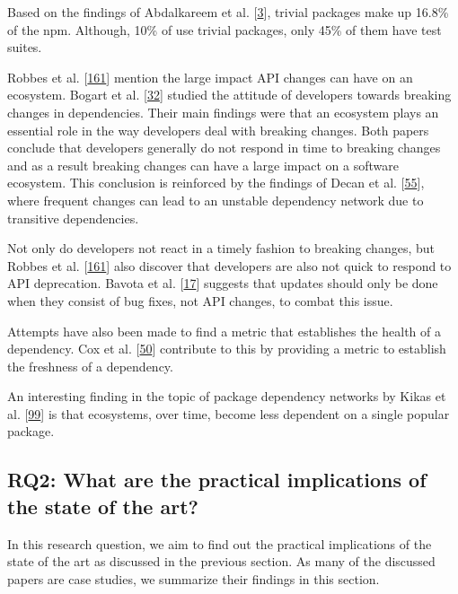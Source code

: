\documentclass[]{book}
\begin{document}
Based on the findings of Abdalkareem et al.
{[}\protect\hyperlink{ref-Abdalkareem2017}{3}{]}, trivial packages make
up 16.8\% of the npm. Although, 10\% of use trivial packages, only 45\%
of them have test suites.

Robbes et al. {[}\protect\hyperlink{ref-Robbes2012}{161}{]} mention the
large impact API changes can have on an ecosystem. Bogart et al.
{[}\protect\hyperlink{ref-Bogart2016}{32}{]} studied the attitude of
developers towards breaking changes in dependencies. Their main findings
were that an ecosystem plays an essential role in the way developers
deal with breaking changes. Both papers conclude that developers
generally do not respond in time to breaking changes and as a result
breaking changes can have a large impact on a software ecosystem. This
conclusion is reinforced by the findings of Decan et al.
{[}\protect\hyperlink{ref-Decan2018}{55}{]}, where frequent changes can
lead to an unstable dependency network due to transitive dependencies.

Not only do developers not react in a timely fashion to breaking
changes, but Robbes et al. {[}\protect\hyperlink{ref-Robbes2012}{161}{]}
also discover that developers are also not quick to respond to API
deprecation. Bavota et al. {[}\protect\hyperlink{ref-Bavota2014}{17}{]}
suggests that updates should only be done when they consist of bug
fixes, not API changes, to combat this issue.

Attempts have also been made to find a metric that establishes the
health of a dependency. Cox et al.
{[}\protect\hyperlink{ref-Cox2015}{50}{]} contribute to this by
providing a metric to establish the freshness of a dependency.

An interesting finding in the topic of package dependency networks by
Kikas et al. {[}\protect\hyperlink{ref-Kikas2017}{99}{]} is that
ecosystems, over time, become less dependent on a single popular
package.

\subsection{RQ2: What are the practical implications of the state of the
art?}\label{rq2-what-are-the-practical-implications-of-the-state-of-the-art}

In this research question, we aim to find out the practical implications
of the state of the art as discussed in the previous section. As many of
the discussed papers are case studies, we summarize their findings in
this section.
\end{document}
